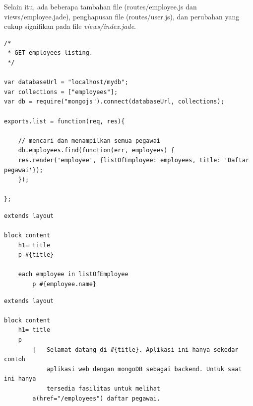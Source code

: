 Selain itu, ada beberapa tambahan file (routes/employee.js dan views/employee.jade), penghapusan file (routes/user.js), dan perubahan yang cukup signifikan pada file \textit{views/index.jade}.

\lstset{language=JavaScript,caption=routes/employee.js}
\begin{lstlisting}
/*
 * GET employees listing.
 */

var databaseUrl = "localhost/mydb";
var collections = ["employees"];
var db = require("mongojs").connect(databaseUrl, collections);

exports.list = function(req, res){

	// mencari dan menampilkan semua pegawai
	db.employees.find(function(err, employees) {
  	res.render('employee', {listOfEmployee: employees, title: 'Daftar pegawai'});
	});

};
\end{lstlisting}

\lstset{language=html,caption=views/employee.jade}
\begin{lstlisting}
extends layout

block content
	h1= title
	p #{title}

	each employee in listOfEmployee
		p #{employee.name}
\end{lstlisting}

\lstset{language=html,caption=views/index.jade}
\begin{lstlisting}
extends layout

block content
	h1= title
	p 
		|	Selamat datang di #{title}. Aplikasi ini hanya sekedar contoh 
			aplikasi web dengan mongoDB sebagai backend. Untuk saat ini hanya 
			tersedia fasilitas untuk melihat 
		a(href="/employees") daftar pegawai.
\end{lstlisting}
